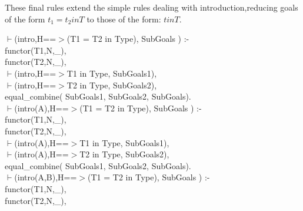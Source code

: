 \documentclass[11pt]{report}
\begin{document}
\begin{description}
 These final rules extend the simple rules dealing with introduction,reducing
  goals of the form $t_{1}=t_{2} in T$ to those of the form: $t in T$.
\begin{sf}\begin{tabbing}
$\vdash$(intro,H==$>$(T1  = T2 in Type), SubGoals ) :-\\[-0.15ex]
\hspace{2em}functor(T1,N,\_\hspace{0.1em}),\\[-0.15ex]
\hspace{2em}functor(T2,N,\_\hspace{0.1em}),\\[-0.15ex]
\hspace{2em}$\vdash$(intro,H==$>$T1 in Type, SubGoals1),\\[-0.15ex]
\hspace{2em}$\vdash$(intro,H==$>$T2 in Type, SubGoals2),\\[-0.15ex]
\hspace{2em}equal\_\hspace{0.1em}combine( SubGoals1, SubGoals2, SubGoals).\\[-0.15ex]
$\vdash$(intro(A),H==$>$(T1  = T2 in Type), SubGoals ) :-\\[-0.15ex]
\hspace{2em}functor(T1,N,\_\hspace{0.1em}),\\[-0.15ex]
\hspace{2em}functor(T2,N,\_\hspace{0.1em}),\\[-0.15ex]
\hspace{2em}$\vdash$(intro(A),H==$>$T1 in Type, SubGoals1),\\[-0.15ex]
\hspace{2em}$\vdash$(intro(A),H==$>$T2 in Type, SubGoals2),\\[-0.15ex]
\hspace{2em}equal\_\hspace{0.1em}combine( SubGoals1, SubGoals2, SubGoals).\\[-0.15ex]
$\vdash$(intro(A,B),H==$>$(T1  = T2 in Type), SubGoals ) :-\\[-0.15ex]
\hspace{2em}functor(T1,N,\_\hspace{0.1em}),\\[-0.15ex]
\hspace{2em}functor(T2,N,\_\hspace{0.1em}),\\[-0.15ex]

\end{tabbing}
\end{sf}
\end{description}
\end{document}

